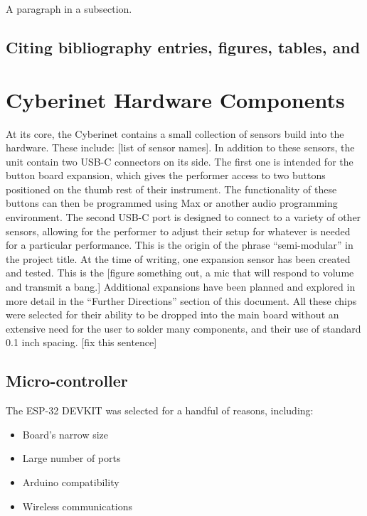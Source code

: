 A paragraph in a subsection.

\section{Citing bibliography entries, figures, tables, and }



\chapter{Cyberinet Hardware Components}

At its core, the Cyberinet contains a small collection of sensors build into the hardware. These include: [list of sensor names]. In addition to these sensors, the unit contain two USB-C connectors on its side. The first one is intended for the button board expansion, which gives the performer access to two buttons positioned on the thumb rest of their instrument. The functionality of these buttons can then be programmed using Max or another audio programming environment. The second USB-C port is designed to connect to a variety of other sensors, allowing for the performer to adjust their setup for whatever is needed for a particular performance. This is the origin of the phrase “semi-modular” in the project title. At the time of writing, one expansion sensor has been created and tested. This is the [figure something out, a mic that will respond to volume and transmit a bang.] Additional expansions have been planned and explored in more detail in the “Further Directions” section of this document. 
All these chips were selected for their ability to be dropped into the main board without an extensive need for the user to solder many components, and their use of standard 0.1 inch spacing. [fix this sentence]

\section{Micro-controller}
The ESP-32 DEVKIT was selected for a handful of reasons, including:

\begin{itemize}
    \item Board's narrow size
    \item Large number of ports
    \item Arduino compatibility
    \item Wireless communications
\end{itemize}

